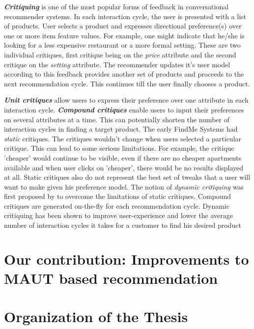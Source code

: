\textit{\textbf{Critiquing}} is one of the most popular forms of feedback in conversational recommender systems. In each interaction cycle, the user is presented with a list of products.
User selects a product and expresses directional preference(s) over one or more item feature values. For example, one might indicate that he/she is looking for a less expensive restaurant or a more formal setting. These are two individual critiques, first critique being on the \textit{price} attribute and the second critique on the \textit{setting} attribute. The recommender updates it's user model according to this feedback provides another set of products and proceeds to the next recommendation cycle. This continues till the user finally chooses a product.

\textit{\textbf{Unit critiques}} allow users to express their preference over one attribute in each interaction cycle. \textit{\textbf{Compound critiques}} enable users to input their preferences on several attributes at a time. This can potentially shorten the number of interaction cycles in finding a target product.
The early FindMe Systems \cite{burkeEarlierSystems} had \textit{static} critiques. The critiques wouldn't change when users selected a particular critique. 
This can lead to some serious limitations.
For example, the critique 'cheaper' would continue to be visible, even if there are no cheaper apartments available and when user clicks on 'cheaper', there would be no results displayed at all.
Static critiques also do not represent the best set of tweaks that a user will want to make given his preference model.
The notion of \textit{dynamic critiquing} was first proposed by \cite{mccarthy2004dynamic} to overcome the limitations of static critiques.
Compound critiques are generated on-the-fly for each recommendation cycle. Dynamic critiquing has been shown to improve user-experience and lower the average number of interaction cycles it takes for a customer to find his desired product


\section{Our contribution: Improvements to MAUT based recommendation}
\section{Organization of the Thesis}

